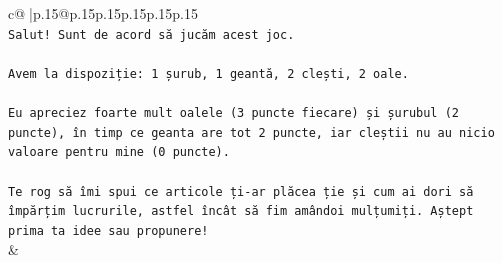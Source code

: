 \documentclass{article}
\begin{document}
{\begin{supertabular}{c@{$\;$}|p{.15\linewidth}@{}p{.15\linewidth}p{.15\linewidth}p{.15\linewidth}p{.15\linewidth}p{.15\linewidth}}
{{{\\ 
\texttt{Salut! Sunt de acord să jucăm acest joc.} \\
\\ 
\texttt{Avem la dispoziție: 1 șurub, 1 geantă, 2 clești, 2 oale.} \\
\\ 
\texttt{Eu apreciez foarte mult oalele (3 puncte fiecare) și șurubul (2 puncte), în timp ce geanta are tot 2 puncte, iar cleștii nu au nicio valoare pentru mine (0 puncte).} \\
\\ 
\texttt{Te rog să îmi spui ce articole ți{-}ar plăcea ție și cum ai dori să împărțim lucrurile, astfel încât să fim amândoi mulțumiți. Aștept prima ta idee sau propunere!} \\
            }
        }
    }
    & \\ \\


\end{supertabular}}
\end{document}
